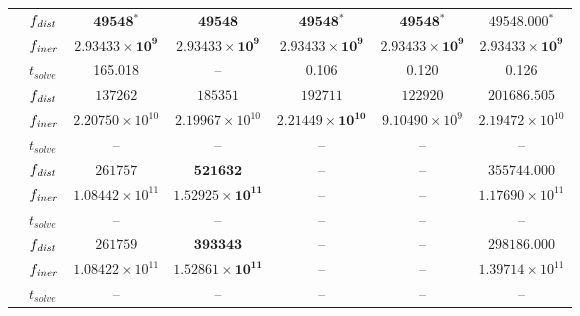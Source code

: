 \begin{table}[!b]
\begin{tabular}{llccccc}
		 & $f_\mathit{dist}$ & $\mathbf{49548{}^*}$ & $\mathbf{49548}$ & $\mathbf{49548{}^*}$ & $\mathbf{49548{}^*}$ & $\mathbf{49548.000{}^*}$ \\
		& $f_\mathit{iner}$ & $\mathbf{2.93433\times 10^{9}}$ & $\mathbf{2.93433\times 10^{9}}$ & $\mathbf{2.93433\times 10^{9}}$ & $\mathbf{2.93433\times 10^{9}}$ & $\mathbf{2.93433\times 10^{9}}$ \\
		& $t_{solve}$ & 165.018 & -- & 0.106 & 0.120 & 0.126 \\
		\midrule
		
		 & $f_\mathit{dist}$ & $137262$ & $185351$ & $192711$ & $122920$ & $\mathbf{201686.505}$ \\
		& $f_\mathit{iner}$ & $2.20750\times 10^{10}$ & $2.19967\times 10^{10}$ & $\mathbf{2.21449\times 10^{10}}$ & $9.10490\times 10^{9}$ & $2.19472\times 10^{10}$ \\
		& $t_{solve}$ & -- & -- & -- & -- & -- \\
		\midrule
		
		 & $f_\mathit{dist}$ & $261757$ & $\mathbf{521632}$ & -- & -- & $355744.000$ \\
		& $f_\mathit{iner}$ & $1.08442\times 10^{11}$ & $\mathbf{1.52925\times 10^{11}}$ & -- & -- & $1.17690\times 10^{11}$ \\
		& $t_{solve}$ & -- & -- & -- & -- & -- \\
		\midrule
		
		 & $f_\mathit{dist}$ & $261759$ & $\mathbf{393343}$ & -- & -- & $298186.000$ \\
		& $f_\mathit{iner}$ & $1.08422\times 10^{11}$ & $\mathbf{1.52861\times 10^{11}}$ & -- & -- & $1.39714\times 10^{11}$ \\
		& $t_{solve}$ & -- & -- & -- & -- & -- \\
		
		\bottomrule
	\end{tabular}
\end{table}


